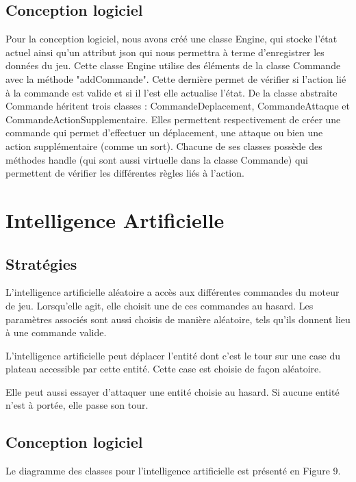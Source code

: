 \documentclass[a4paper,12pt]{article}
\begin{document}
\subsection{Conception logiciel}
Pour la conception logiciel, nous avons créé une classe Engine, qui stocke l'état actuel ainsi qu'un attribut json qui nous permettra à terme d'enregistrer les données du jeu. Cette classe Engine utilise des éléments de la classe Commande avec la méthode "addCommande". Cette dernière permet de vérifier si l'action lié à la commande est valide et si il l'est elle actualise l'état. De la classe abstraite Commande héritent trois classes : CommandeDeplacement, CommandeAttaque et CommandeActionSupplementaire. Elles permettent respectivement de créer une commande qui permet d'effectuer un déplacement, une attaque ou bien une action supplémentaire (comme un sort). Chacune de ses classes possède des méthodes handle (qui sont aussi virtuelle dans la classe Commande) qui permettent de vérifier les différentes règles liés à l'action.


\clearpage
\section{Intelligence Artificielle}


\subsection{Stratégies}
L'intelligence artificielle aléatoire a accès aux différentes commandes du moteur de jeu. Lorsqu'elle agit, elle choisit une de ces commandes au hasard. Les paramètres associés sont aussi choisis de manière aléatoire, tels qu'ils donnent lieu à une commande valide.

L'intelligence artificielle peut déplacer l'entité dont c'est le tour sur une case du plateau accessible par cette entité. Cette case est choisie de façon aléatoire.

Elle peut aussi essayer d'attaquer une entité choisie au hasard. Si aucune entité n'est à portée, elle passe son tour.

\subsection{Conception logiciel}
Le diagramme des classes pour l'intelligence artificielle est présenté en Figure 9.
\end{document}
